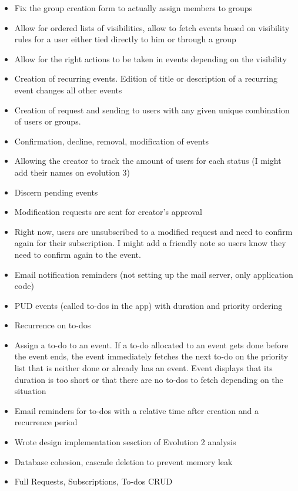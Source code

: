 \documentclass[11pt]{article}
\begin{document}
\begin{itemize}

\item Fix the group creation form to actually assign members to groups
\item Allow for ordered lists of visibilities, allow to fetch events based on visibility rules for a user either tied directly to him or through a group
\item Allow for the right actions to be taken in events depending on the visibility
\item Creation of recurring events. Edition of title or description of a recurring event changes all other events
\item Creation of request and sending to users with any given unique combination of users or groups.
\item Confirmation, decline, removal, modification of events
\item Allowing the creator to track the amount of users for each status (I might add their names on evolution 3)
\item Discern pending events
\item Modification requests are sent for creator’s approval
\item Right now, users are unsubscribed to a modified request and need to confirm again for their subscription. I might add a friendly note so users know they need to confirm again to the event.
\item Email notification reminders (not setting up the mail server, only application code)
\item PUD events (called to-dos in the app) with duration and priority ordering
\item Recurrence on to-dos
\item Assign a to-do to an event. If a to-do allocated to an event gets done before the event ends, the event immediately fetches the next to-do on the priority list that is neither done or already has an event. Event displays that its duration is too short or that there are no to-dos to fetch depending on the situation
\item Email reminders for to-dos with a relative time after creation and a recurrence period
\item Wrote design implementation sesction of Evolution 2 analysis
\item Database cohesion, cascade deletion to prevent memory leak
\item Full Requests, Subscriptions, To-dos CRUD

\end{itemize}
\end{document}
